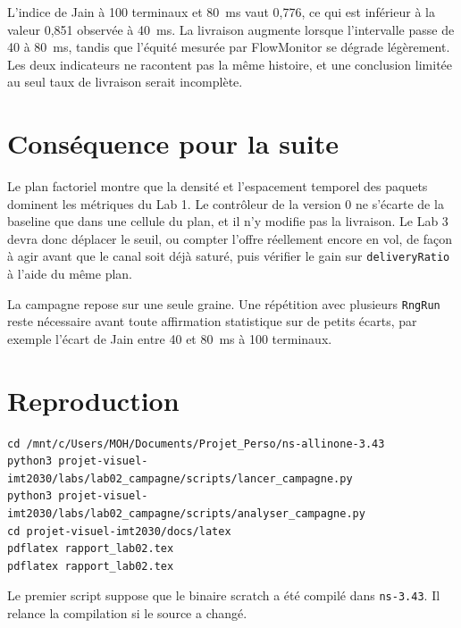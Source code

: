 \documentclass[11pt,a4paper]{article}
\begin{document}
L'indice de Jain à 100 terminaux et 80~ms vaut 0,776, ce qui est inférieur à la valeur 0,851 observée à 40~ms. La livraison augmente lorsque l'intervalle passe de 40 à 80~ms, tandis que l'équité mesurée par FlowMonitor se dégrade légèrement. Les deux indicateurs ne racontent pas la même histoire, et une conclusion limitée au seul taux de livraison serait incomplète.

\section{Conséquence pour la suite}

Le plan factoriel montre que la densité et l'espacement temporel des paquets dominent les métriques du Lab 1. Le contrôleur de la version 0 ne s'écarte de la baseline que dans une cellule du plan, et il n'y modifie pas la livraison. Le Lab 3 devra donc déplacer le seuil, ou compter l'offre réellement encore en vol, de façon à agir avant que le canal soit déjà saturé, puis vérifier le gain sur \texttt{deliveryRatio} à l'aide du même plan.

La campagne repose sur une seule graine. Une répétition avec plusieurs \texttt{RngRun} reste nécessaire avant toute affirmation statistique sur de petits écarts, par exemple l'écart de Jain entre 40 et 80~ms à 100 terminaux.

\section{Reproduction}

\begin{lstlisting}
cd /mnt/c/Users/MOH/Documents/Projet_Perso/ns-allinone-3.43
python3 projet-visuel-imt2030/labs/lab02_campagne/scripts/lancer_campagne.py
python3 projet-visuel-imt2030/labs/lab02_campagne/scripts/analyser_campagne.py
cd projet-visuel-imt2030/docs/latex
pdflatex rapport_lab02.tex
pdflatex rapport_lab02.tex
\end{lstlisting}

Le premier script suppose que le binaire scratch a été compilé dans \texttt{ns-3.43}. Il relance la compilation si le source a changé.
\end{document}
